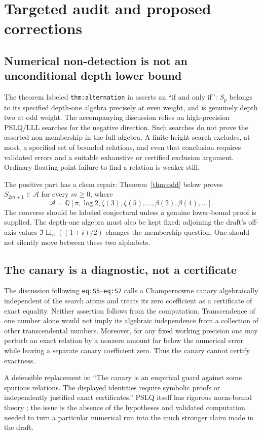 \documentclass[11pt]{article}
\numberwithin{equation}{section}
\theoremstyle{definition}\newtheorem{definition}[theorem]{Definition}
\theoremstyle{remark}\newtheorem{remark}[theorem]{Remark}
\DeclareMathOperator{\Li}{Li}
\newcommand{\Q}{\mathbb Q}\newcommand{\C}{\mathbb C}
\newcommand{\calA}{\mathcal A}
\newcommand{\src}[1]{\nolinkurl{#1}}
\begin{document}
\section{Targeted audit and proposed corrections}
\label{sec:audit}

\subsection{Numerical non-detection is not an unconditional depth lower bound}
The theorem labeled \src{thm:alternation} in \cite{repoGaussian} asserts an ``if and only if'': $S_p$ belongs to its specified depth-one algebra precisely at even weight, and is genuinely depth two at odd weight. The accompanying discussion relies on high-precision PSLQ/LLL searches for the negative direction. Such searches do not prove the asserted non-membership in the full algebra. A finite-height search excludes, at most, a specified set of bounded relations, and even that conclusion requires validated errors and a suitable exhaustive or certified exclusion argument. Ordinary floating-point failure to find a relation is weaker still.

The positive part has a clean repair: Theorem~\ref{thm:odd} below proves $S_{2m+1}\in\calA$ for every $m\ge0$, where
\[
 \calA=\Q[\pi,\log2,\zeta(3),\zeta(5),\ldots,
                    \beta(2),\beta(4),\ldots].
\]
The converse should be labeled conjectural unless a genuine lower-bound proof is supplied. The depth-one algebra must also be kept fixed: adjoining the draft's off-axis values $\Im\Li_n((1+\ii)/2)$ changes the membership question. One should not silently move between these two alphabets.

\subsection{The canary is a diagnostic, not a certificate}
The discussion following \src{eq:S5}--\src{eq:S7} calls a Champernowne canary algebraically independent of the search atoms and treats its zero coefficient as a certificate of exact equality. Neither assertion follows from the computation. Transcendence of one number alone would not imply its algebraic independence from a collection of other transcendental numbers. Moreover, for any fixed working precision one may perturb an exact relation by a nonzero amount far below the numerical error while leaving a separate canary coefficient zero. Thus the canary cannot certify exactness.

A defensible replacement is: ``The canary is an empirical guard against some spurious relations. The displayed identities require symbolic proofs or independently justified exact certificates.'' PSLQ itself has rigorous norm-bound theory \cite{PSLQ}; the issue is the absence of the hypotheses and validated computation needed to turn a particular numerical run into the much stronger claim made in the draft.
\end{document}
